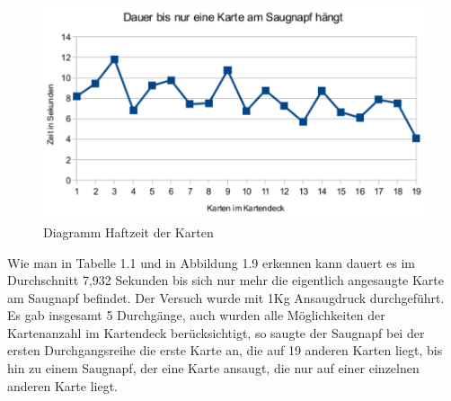 \begin{enumerate}
%

    \begin{figure}[H]
        \centering
        \includegraphics[scale=1,page=1]{fig/mech/Haftzeit}
        \caption{Diagramm Haftzeit der Karten}
    \end{figure}

    Wie man in Tabelle 1.1 und in Abbildung 1.9 erkennen kann dauert es im Durchschnitt 7,932 Sekunden bis sich nur mehr die
    eigentlich angesaugte Karte am Saugnapf befindet. Der Versuch wurde mit 1Kg Ansaugdruck durchgeführt. Es gab insgesamt
    5 Durchgänge, auch wurden alle Möglichkeiten der Kartenanzahl im Kartendeck berücksichtigt, so saugte der Saugnapf
    bei der ersten Durchgangsreihe die erste Karte an, die auf 19 anderen Karten liegt, bis hin zu einem Saugnapf, der
    eine Karte ansaugt, die nur auf einer einzelnen anderen Karte liegt.


\end{enumerate}
